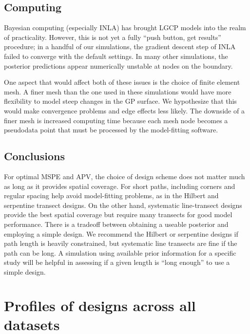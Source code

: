 \documentclass[review]{elsarticle}
\begin{document}


\subsection{Computing}

Bayesian computing (especially INLA) has brought LGCP models into the realm of
practicality. However, this is not yet a fully ``push button, get results''
procedure; in a handful of our simulations, the gradient descent step of INLA
failed to converge with the default settings. In many other simulations, the
posterior predictions appear numerically unstable at nodes on the boundary.

One aspect that would affect both of these issues is the choice of finite
element mesh. A finer mesh than the one used in these simulations would have
more flexibility to model steep changes in the GP surface. We hypothesize that
this would make convergence problems and edge effects less likely. The downside
of a finer mesh is increased computing time because each mesh node becomes a
pseudodata point that must be processed by the model-fitting software.


\subsection{Conclusions}

For optimal MSPE and APV, the choice of design scheme does not matter much as
long as it provides spatial coverage. For short paths, including corners and
regular spacing help avoid model-fitting problems, as in the Hilbert and
serpentine transect designs. On the other hand, systematic line-transect
designs provide the best spatial coverage but require many transects for good
model performance. There is a tradeoff between obtaining a useable posterior
and employing a simple design. We recommend the Hilbert or serpentine designs
if path length is heavily constrained, but systematic line transects are fine
if the path can be long. A simulation using available prior information for a
specific study will be helpful in assessing if a given length is ``long
enough'' to use a simple design.


\appendix
\section{Profiles of designs across all datasets}
\label{profplots}
\end{document}

